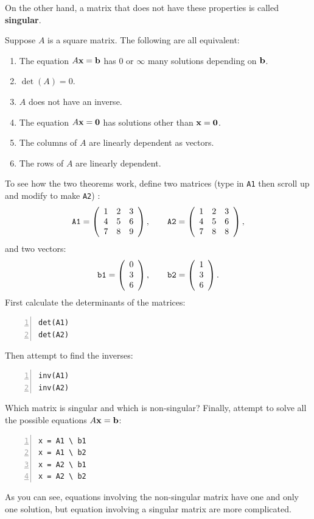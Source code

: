 On the other hand, a matrix that does not have these properties
is called {\bf singular}.
\begin{thm}\label{def:singular}
Suppose $A$ is a square  matrix.
The following are all equivalent:
\begin{enumerate}
\item The equation $A\mathbf{x} = \mathbf{b}$ has 0 or $\infty$ many solutions
  depending on $\mathbf{b}$.
\item $\det(A) = 0$.
\item $A$ does not have an inverse.
\item The equation $A\mathbf{x} = \mathbf{0}$ has solutions other than $\mathbf{x} =
  \mathbf{0}$.
\item The columns of $A$ are linearly dependent as vectors.
\item The rows of $A$ are linearly dependent.
\end{enumerate}
\end{thm}


To see how the two theorems work, define two matrices (type in
\verb&A1& then scroll
up and modify to make \verb&A2&) :
$$
\verb&A1& = \left(\begin{array}{ccc}
        1 & 2 & 3  \\
        4 & 5 & 6 \\
        7 & 8 & 9
      \end{array}\right),
\qquad
\verb&A2& = \left(\begin{array}{ccc}
        1 & 2 & 3  \\
        4 & 5 & 6 \\
        7 & 8 & 8
      \end{array}\right),
$$
and two vectors:
$$
\verb&b1&  = \left(\begin{array}{c}
        0 \\ 3 \\ 6
             \end{array}\right),
\qquad
\verb&b2&  = \left(\begin{array}{c}
        1 \\ 3 \\ 6
             \end{array}\right).
$$
First calculate the determinants of the matrices:
\begin{lstlisting}[frame=none,numbers=left]
det(A1)
det(A2)
\end{lstlisting}
Then attempt to find the inverses:
\begin{lstlisting}[frame=none,numbers=left]
inv(A1)
inv(A2)
\end{lstlisting}
Which matrix is singular and which is non-singular?
Finally, attempt to solve all the possible equations $A \mathbf{x} = \mathbf{b}$:
\begin{lstlisting}[frame=none,numbers=left]
x = A1 \ b1
x = A1 \ b2
x = A2 \ b1
x = A2 \ b2
\end{lstlisting}
As you can see, equations involving the non-singular matrix have one
and only one solution, but equation involving a singular matrix
are more complicated.

